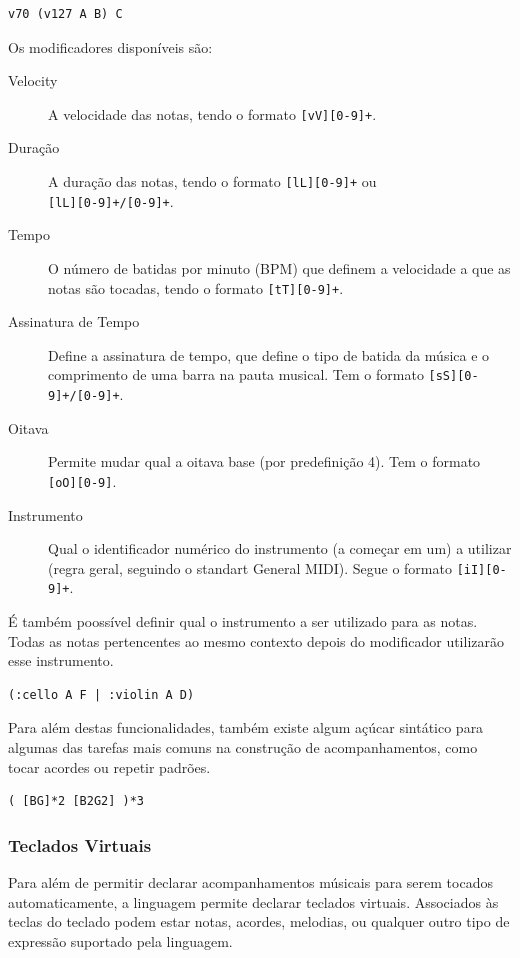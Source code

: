\begin{lstlisting}
v70 (v127 A B) C
\end{lstlisting}

Os modificadores disponíveis são:
\begin{description}
\item[Velocity] A velocidade das notas, tendo o formato \texttt{[vV][0-9]+}.
\item[Duração] A duração das notas, tendo o formato \texttt{[lL][0-9]+} ou \\ \texttt{[lL][0-9]+/[0-9]+}.
\item[Tempo] O número de batidas por minuto (BPM) que definem a velocidade a que as notas são tocadas, tendo o formato \texttt{[tT][0-9]+}.
\item[Assinatura de Tempo] Define a assinatura de tempo, que define o tipo de batida da música e o comprimento de uma barra na pauta musical. Tem o formato \texttt{[sS][0-9]+/[0-9]+}.
\item[Oitava] Permite mudar qual a oitava base (por predefinição 4). Tem o formato \texttt{[oO][0-9]}.
\item[Instrumento] Qual o identificador numérico do instrumento (a começar em um) a utilizar (regra geral, seguindo o standart General MIDI). Segue o formato \texttt{[iI][0-9]+}.
\end{description}

É também poossível definir qual o instrumento a ser utilizado para as notas. Todas as notas pertencentes ao mesmo contexto depois do modificador utilizarão esse instrumento.

\begin{lstlisting}
(:cello A F | :violin A D)
\end{lstlisting}

Para além destas funcionalidades, também existe algum açúcar sintático para algumas das tarefas mais comuns na construção de acompanhamentos, como tocar acordes ou repetir padrões.

\begin{lstlisting}
( [BG]*2 [B2G2] )*3
\end{lstlisting}

\subsubsection{Teclados Virtuais}
Para além de permitir declarar acompanhamentos músicais para serem tocados automaticamente, a linguagem permite declarar teclados virtuais. Associados às teclas do teclado podem estar notas, acordes, melodias, ou qualquer outro tipo de expressão suportado pela linguagem.


